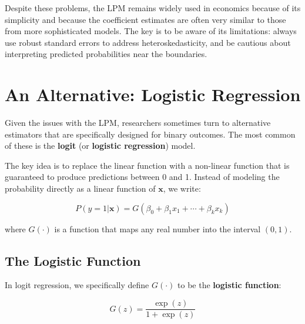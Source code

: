 \documentclass[
  letterpaper,
  DIV=11,
  numbers=noendperiod]{scrreprt}
\begin{document}
\begin{tcolorbox}[enhanced jigsaw, arc=.35mm, bottomrule=.15mm, bottomtitle=1mm, breakable, colback=white, colbacktitle=quarto-callout-important-color!10!white, colframe=quarto-callout-important-color-frame, coltitle=black, left=2mm, leftrule=.75mm, opacityback=0, opacitybacktitle=0.6, rightrule=.15mm, title=\textcolor{quarto-callout-important-color}{\faExclamation}\hspace{0.5em}{LPM: Use with Caution}, titlerule=0mm, toprule=.15mm, toptitle=1mm]

Despite these problems, the LPM remains widely used in economics because
of its simplicity and because the coefficient estimates are often very
similar to those from more sophisticated models. The key is to be aware
of its limitations: always use robust standard errors to address
heteroskedasticity, and be cautious about interpreting predicted
probabilities near the boundaries.

\end{tcolorbox}

\section{An Alternative: Logistic
Regression}\label{an-alternative-logistic-regression}

Given the issues with the LPM, researchers sometimes turn to alternative
estimators that are specifically designed for binary outcomes. The most
common of these is the \textbf{logit} (or \textbf{logistic regression})
model.

The key idea is to replace the linear function with a non-linear
function that is guaranteed to produce predictions between 0 and 1.
Instead of modeling the probability directly as a linear function of
\(\mathbf{x}\), we write:

\[
P(y = 1 | \mathbf{x}) = G(\beta_0 + \beta_1 x_1 + \cdots + \beta_k x_k)
\]

where \(G(\cdot)\) is a function that maps any real number into the
interval \((0, 1)\).

\subsection{The Logistic Function}\label{the-logistic-function}

In logit regression, we specifically define \(G(\cdot)\) to be the
\textbf{logistic function}:

\[
G(z) = \frac{\exp(z)}{1 + \exp(z)}
\]
\end{document}
